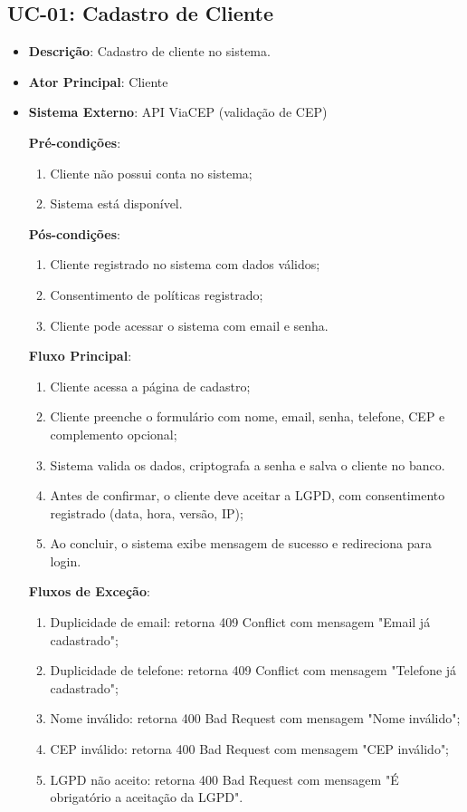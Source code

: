 \subsection{UC-01: Cadastro de Cliente}

\begin{itemize}[topsep=1pt, itemsep=0pt]
  \item[]\textbf{Descrição}: Cadastro de cliente no sistema.

  \item[]\textbf{Ator Principal}: Cliente

  \item[]\textbf{Sistema Externo}: API ViaCEP (validação de CEP)

  \textbf{Pré-condições}:
  \begin{enumerate}
    \item Cliente não possui conta no sistema;
    \item Sistema está disponível.
  \end{enumerate}

  \textbf{Pós-condições}:
  \begin{enumerate}
    \item Cliente registrado no sistema com dados válidos;
    \item Consentimento de políticas registrado;
    \item Cliente pode acessar o sistema com email e senha.
  \end{enumerate}

  \textbf{Fluxo Principal}:
  \begin{enumerate}
    \item Cliente acessa a página de cadastro;
    \item Cliente preenche o formulário com nome, email, senha, telefone, CEP e complemento opcional;
    \item Sistema valida os dados, criptografa a senha e salva o cliente no banco.
    \item Antes de confirmar, o cliente deve aceitar a LGPD, com consentimento registrado (data, hora, versão, IP);
    \item Ao concluir, o sistema exibe mensagem de sucesso e redireciona para login.
  \end{enumerate}

  \textbf{Fluxos de Exceção}:
  \begin{enumerate}
    \item Duplicidade de email: retorna 409 Conflict com mensagem "Email já cadastrado";
    \item Duplicidade de telefone: retorna 409 Conflict com mensagem "Telefone já cadastrado";
    \item Nome inválido: retorna 400 Bad Request com mensagem "Nome inválido";
    \item CEP inválido: retorna 400 Bad Request com mensagem "CEP inválido";
    \item LGPD não aceito: retorna 400 Bad Request com mensagem "É obrigatório a aceitação da LGPD".
  \end{enumerate}


\end{itemize}
